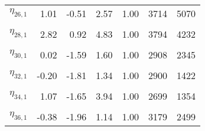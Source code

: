 \begin{table}
\begin{tabular}[t]{lrrrrrr}
$\eta_{26, 1}$ & 1.01 & -0.51 & 2.57 & 1.00 & 3714 & 5070\\
\cellcolor{gray!6}{$\eta_{27, 1}$} & \cellcolor{gray!6}{0.90} & \cellcolor{gray!6}{-0.51} & \cellcolor{gray!6}{2.31} & \cellcolor{gray!6}{1.00} & \cellcolor{gray!6}{2541} & \cellcolor{gray!6}{2025}\\
$\eta_{28, 1}$ & 2.82 & 0.92 & 4.83 & 1.00 & 3794 & 4232\\
\cellcolor{gray!6}{$\eta_{29, 1}$} & \cellcolor{gray!6}{-0.49} & \cellcolor{gray!6}{-1.76} & \cellcolor{gray!6}{0.74} & \cellcolor{gray!6}{1.00} & \cellcolor{gray!6}{3274} & \cellcolor{gray!6}{3248}\\
$\eta_{30, 1}$ & 0.02 & -1.59 & 1.60 & 1.00 & 2908 & 2345\\
\cellcolor{gray!6}{$\eta_{31, 1}$} & \cellcolor{gray!6}{1.19} & \cellcolor{gray!6}{-0.99} & \cellcolor{gray!6}{3.55} & \cellcolor{gray!6}{1.00} & \cellcolor{gray!6}{2836} & \cellcolor{gray!6}{2966}\\
$\eta_{32, 1}$ & -0.20 & -1.81 & 1.34 & 1.00 & 2900 & 1422\\
\cellcolor{gray!6}{$\eta_{33, 1}$} & \cellcolor{gray!6}{3.30} & \cellcolor{gray!6}{0.45} & \cellcolor{gray!6}{6.55} & \cellcolor{gray!6}{1.01} & \cellcolor{gray!6}{1727} & \cellcolor{gray!6}{2630}\\
$\eta_{34, 1}$ & 1.07 & -1.65 & 3.94 & 1.00 & 2699 & 1354\\
\cellcolor{gray!6}{$\eta_{35, 1}$} & \cellcolor{gray!6}{0.76} & \cellcolor{gray!6}{-0.89} & \cellcolor{gray!6}{2.48} & \cellcolor{gray!6}{1.00} & \cellcolor{gray!6}{3519} & \cellcolor{gray!6}{2225}\\
$\eta_{36, 1}$ & -0.38 & -1.96 & 1.14 & 1.00 & 3179 & 2499\\
\bottomrule
\end{tabular}
\end{table}